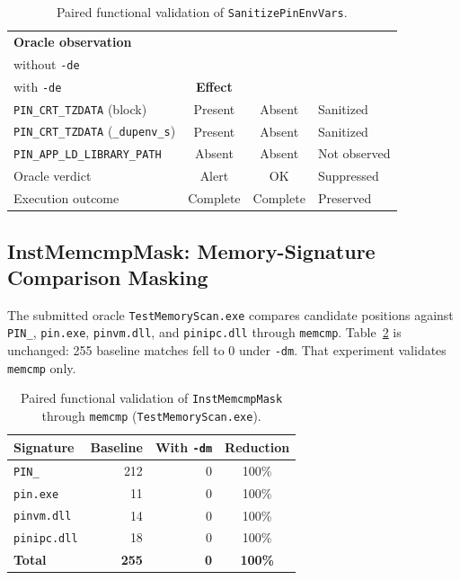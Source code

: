 \documentclass[pdflatex,sn-mathphys-num]{sn-jnl}
\theoremstyle{thmstyleone}
\theoremstyle{thmstyletwo}
\theoremstyle{thmstylethree}
\begin{document}
\begin{table}[t]
\caption{Paired functional validation of \texttt{SanitizePinEnvVars}.}
\label{tab:environment_validation}
\centering
\small
\begin{tabularx}{\columnwidth}{@{}Xccp{}@{}}
\toprule
\textbf{Oracle observation} & \shortstack{\textbf{Baseline}\\without \texttt{-de}} & \shortstack{\textbf{Sanitized}\\with \texttt{-de}} & \textbf{Effect} \\
\midrule
\texttt{PIN\_CRT\_TZDATA} (block) & Present & Absent & Sanitized \\
\texttt{PIN\_CRT\_TZDATA} (\texttt{\_dupenv\_s}) & Present & Absent & Sanitized \\
\texttt{PIN\_APP\_LD\_LIBRARY\_PATH} & Absent & Absent & Not observed \\
Oracle verdict & Alert & OK & Suppressed \\
Execution outcome & Complete & Complete & Preserved \\
\bottomrule
\end{tabularx}
\end{table}

\subsection{InstMemcmpMask: Memory-Signature Comparison Masking}
\label{subsec:memory_comparison_masking}

The submitted oracle \texttt{TestMemoryScan.exe} compares candidate positions against \texttt{PIN\_}, \texttt{pin.exe}, \texttt{pinvm.dll}, and \texttt{pinipc.dll} through \texttt{memcmp}. Table~\ref{tab:memory_masking_validation} is unchanged: 255 baseline matches fell to 0 under \texttt{-dm}. That experiment validates \texttt{memcmp} only.

\begin{table}[t]
\caption{Paired functional validation of \texttt{InstMemcmpMask} through \texttt{memcmp} (\texttt{TestMemoryScan.exe}).}
\label{tab:memory_masking_validation}
\centering
\small
\begin{tabularx}{\columnwidth}{@{}Xrrc@{}}
\toprule
\textbf{Signature} & \textbf{Baseline} & \textbf{With \texttt{-dm}} & \textbf{Reduction} \\
\midrule
\texttt{PIN\_} & 212 & 0 & 100\% \\
\texttt{pin.exe} & 11 & 0 & 100\% \\
\texttt{pinvm.dll} & 14 & 0 & 100\% \\
\texttt{pinipc.dll} & 18 & 0 & 100\% \\
\midrule
\textbf{Total} & \textbf{255} & \textbf{0} & \textbf{100\%} \\
\bottomrule
\end{tabularx}
\end{table}
\end{document}
